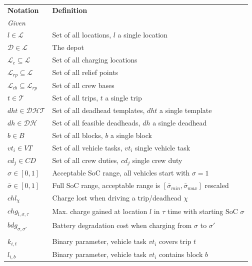 \documentclass[]{article}
\begin{document}
\begin{table}[ht]
  \centering
  \begin{tabular}{ll}
    \toprule
    \multicolumn{1}{l}{\textbf{Notation}} & \multicolumn{1}{l}{\textbf{Definition}}               \\
    \cmidrule(lr){1-1}\cmidrule(lr){2-2}
    \multicolumn{2}{l}{\textit{Given}} \\
    $l \in \mathcal{L}$ & Set of all locations, $l$ a single location \\ 
    $\mathcal{D} \in \mathcal{L}$ & The depot \\ 
    $\mathcal{L}_c \subseteq \mathcal{L}$ & Set of all charging locations \\ 
    $\mathcal{L}_{rp} \subseteq \mathcal{L}$ & Set of all relief points \\ 
    $\mathcal{L}_{cb} \subseteq \mathcal{L}_{rp}$ & Set of all crew bases \\ 
    $t \in \mathcal{T}$ & Set of all trips, $t$ a single trip \\
    $dht \in \mathcal{DHT}$ & Set of all deadhead templates, $dht$ a single template \\ 
    $dh \in \mathcal{DH}$ & Set of all feasible deadheads, $dh$ a single deadhead \\ 
    $b \in B$ & Set of all blocks, $b$ a single block \\
    $vt_i \in VT$ & Set of all vehicle tasks, $vt_i$ single vehicle task \\
    $cd_j \in CD$ & Set of all crew duties, $cd_j$ single crew duty \\
    $\sigma \in [0, 1]$ & Acceptable SoC range, all vehicles start with $\sigma=1$\\
    $\bar{\sigma} \in [0, 1]$ & Full SoC range, acceptable range is $[\bar{\sigma}_{min}, \bar{\sigma}_{max}]$ rescaled \\
    $chl_\chi$ & Charge lost when driving a trip/deadhead $\chi$ \\
    $chg_{l,\sigma,\tau}$ & Max. charge gained at location $l$ in $\tau$ time with starting SoC $\sigma$ \\
    $bdg_{\sigma,\sigma'}$ & Battery degradation cost when charging from $\sigma$ to $\sigma'$ \\
    \addlinespace[0.6em]
    \multicolumn{2}{l}{\textit{Parameters}} \\
    $k_{i,t}$ & Binary parameter, vehicle task $vt_i$ covers trip $t$ \\ 
    $l_{i,b}$ & Binary parameter, vehicle task $vt_i$ contains block $b$ \\ 

\end{tabular}
\end{table}
\end{document}
